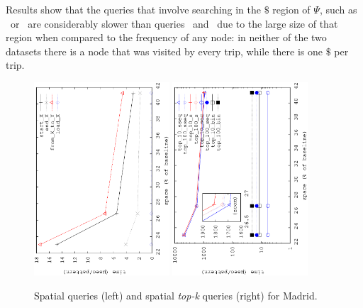 	Results show that the queries that involve searching in the $\$$ region of 
	$\Psi$, such as \startX\ or \XtoY\ are considerably slower than queries \endX\ and \loadX\ 
	due to the large size of that region when compared to the frequency of any node: in neither of the two datasets there is a node that was visited by every trip, while there is one $\$$ per trip.

	\begin{figure}[ht]
		\begin{center}
			{\includegraphics[angle=-90,width=0.45\textwidth]{figures_synt/madrid_spatial.eps}}
			{\includegraphics[angle=-90,width=0.45\textwidth]{figures_synt/madrid_spatial_topk.eps}}
		\end{center}
		\caption{Spatial queries (left) and spatial {\em top-k} queries (right) for Madrid.}
		\label{fig:ctr:exp:queries:spat:madrid}


\end{figure}
